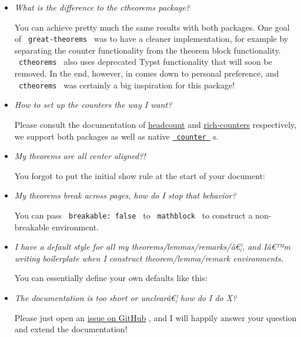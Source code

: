 \begin{itemize}
\item
  \emph{What is the difference to the ctheorems package?}

  You can achieve pretty much the same results with both packages. One
  goal of \texttt{\ great-theorems\ } was to have a cleaner
  implementation, for example by separating the counter functionality
  from the theorem block functionality. \texttt{\ ctheorems\ } also uses
  deprecated Typst functionality that will soon be removed. In the end,
  however, in comes down to personal preference, and
  \texttt{\ ctheorems\ } was certainly a big inspiration for this
  package!
\item
  \emph{How to set up the counters the way I want?}

  Please consult the documentation of
  \href{https://typst.app/universe/package/headcount/}{headcount} and
  \href{https://typst.app/universe/package/rich-counters/}{rich-counters}
  respectively, we support both packages as well as native
  \href{https://typst.app/docs/reference/introspection/counter/}{\texttt{\ counter\ }}
  s.
\item
  \emph{My theorems are all center aligned?!}

  You forgot to put the initial show rule at the start of your document:

\begin{Shaded}
\begin{Highlighting}[]
\end{Highlighting}
\end{Shaded}
\item
  \emph{My theorems break across pages, how do I stop that behavior?}

  You can pass \texttt{\ breakable:\ false\ } to \texttt{\ mathblock\ }
  to construct a non-breakable environment.
\item
  \emph{I have a default style for all my theorems/lemmas/remarks/â€¦,
  and Iâ€™m writing boilerplate when I construct theorem/lemma/remark
  environments.}

  You can essentially define your own defaults like this:

\begin{Shaded}
\begin{Highlighting}[]

\end{Highlighting}
\end{Shaded}
\item
  \emph{The documentation is too short or unclearâ€¦ how do I do X?}

  Please just open an
  \href{https://github.com/jbirnick/typst-great-theorems/issues}{issue
  on GitHub} , and I will happily answer your question and extend the
  documentation!
\end{itemize}

